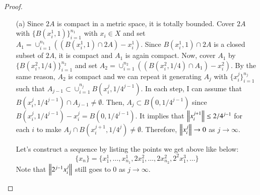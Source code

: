 \documentclass[a4paper, 12pt]{article}
\theoremstyle{Mydefinition}
\theoremstyle{Mytheorem}
\begin{document}
\begin{proof}
\begin{enumerate}
    \item[(a)] Since $2A$ is compact in a metric space, it is totally bounded. Cover $2A$ with $\{B(x^1_i, 1)\}_{i=1}^{n_1}$ with $x_i\in X$ and set $A_1 = \cup_{i=1}^{n_1} \left((B(x^1_i, 1)\cap 2A)-x^1_i\right)$. Since $B(x^1_i,1)\cap 2A$ is a closed subset of $2A$, it is compact and $A_1$ is again compact. Now, cover $A_1$ by $\{B(x^2_i, 1/4)\}_{i=1}^{n_2}$ and set $A_2 = \cup_{i=1}^{n_2}\left((B(x^2_i, 1/4)\cap A_1)-x^2_i\right)$. By the same reason, $A_2$ is compact and we can repeat it generating $A_j$ with $\{x^j_i\}_{i=1}^{n_j}$ such that $A_{j-1}\subset \cup_{i=1}^{n_j} B(x^j_i, 1/4^{j-1})$. In each step, I can assume that $B(x^j_i, 1/4^{j-1})\cap A_{j-1}\neq \emptyset$. Then, $A_j\subset B(0, 1/4^{j-1})$ since $B(x^j_i, 1/4^{j-1})-x^j_i = B(0, 1/4^{j-1})$. It implies that $\norm{x^{j+1}_i}\leq 2/4^{j-1}$ for each $i$ to make  $A_j \cap B(x^{j+1}_i, 1/4^j)\neq \emptyset$. Therefore, $\norm{x^j_i}\rightarrow 0$ as $j\rightarrow \infty$.
    
    Let's construct a sequence by listing the points we get above like below:
    \begin{equation}
        \{x_n\} = \{x^1_1, \ldots, x^1_{n_1}, 2x^2_1, \ldots, 2x^2_{n_2}, 2^2 x^3_1, \ldots\}
    \end{equation}
    Note that $\norm{2^{j-1} x^j_i}$ still goes to $0$ as $j\rightarrow \infty$.
    

\end{enumerate}
\end{proof}
\end{document}
